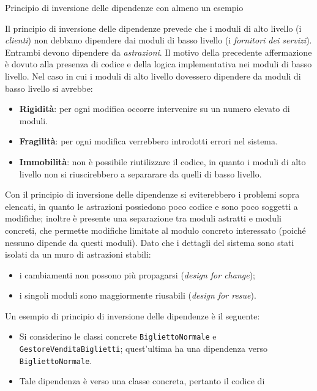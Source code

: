 \begin{problem}{1.12}
Principio di inversione delle dipendenze con almeno un esempio
\end{problem}
\begin{solution}
Il principio di inversione delle dipendenze prevede che i moduli di alto livello (i \textit{clienti}) non debbano dipendere dai moduli di basso livello (i \textit{fornitori dei servizi}). Entrambi devono dipendere da \textit{astrazioni}.
\newline
Il motivo della precedente affermazione è dovuto alla presenza di codice e della logica implementativa nei moduli di basso livello. Nel caso in cui i moduli di alto livello dovessero dipendere da moduli di basso livello si avrebbe:
\begin{itemize}
	\item \textbf{Rigidità}: per ogni modifica occorre intervenire su un numero elevato di moduli.
	\item \textbf{Fragilità}: per ogni modifica verrebbero introdotti errori nel sistema.
    \item \textbf{Immobilità}: non è possibile riutilizzare il codice, in
        quanto i moduli di alto livello non si riuscirebbero a separarare da
        quelli di basso livello.
\end{itemize}
Con il principio di inversione delle dipendenze si eviterebbero i problemi
sopra elencati, in quanto le astrazioni possiedono poco codice e sono poco
soggetti a modifiche; inoltre è presente una separazione tra moduli astratti e
moduli concreti, che permette modifiche limitate al modulo concreto interessato
(poiché nessuno dipende da questi moduli).
Dato che i dettagli del sistema sono stati isolati da un muro di astrazioni stabili:
\begin{itemize}
	\item i cambiamenti non possono più propagarsi (\textit{design for change});
	\item i singoli moduli sono maggiormente riusabili (\textit{design for resue}).
\end{itemize}
Un esempio di principio di inversione delle dipendenze è il seguente:
\begin{itemize}
    \item Si considerino le classi concrete \texttt{BigliettoNormale} e
        \texttt{GestoreVenditaBiglietti}; quest'ultima ha una dipendenza verso
        \texttt{BigliettoNormale}.
    \item Tale dipendenza è verso una classe concreta, pertanto il codice di

\end{itemize}
\end{solution}
